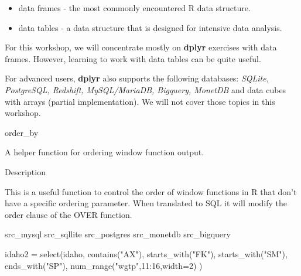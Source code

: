 	\begin{itemize}
		\item data frames - the  most commonly encountered R data structure. 
		\item data tables - a data structure that is designed for intensive data analysis.
	\end{itemize}
	
	\noindent For this workshop, we will concentrate mostly on \textbf{dplyr} exercises with data frames. However, learning to work with data tables can be quite useful.\\
	\bigskip
	
	\noindent For advanced users, \textbf{dplyr} also supports the following databases: \textit{SQLite, PostgreSQL, Redshift, MySQL/MariaDB, Bigquery, MonetDB} and data cubes with arrays (partial implementation). We will not cover those topics in this workshop.
	




order\_by 

A helper function for ordering window function output.

Description

This is a useful function to control the order of window functions in R that don’t have a specific
ordering parameter. When translated to SQL it will modify the order clause of the OVER function.


src_mysql
src_sqllite
src_postgres
src_monetdb
src_bigquery


idaho2 = select(idaho,
contains("AX"),
starts_with("FK"),
starts_with("SM"),
ends_with("SP"),
num_range("wgtp",11:16,width=2)
)

